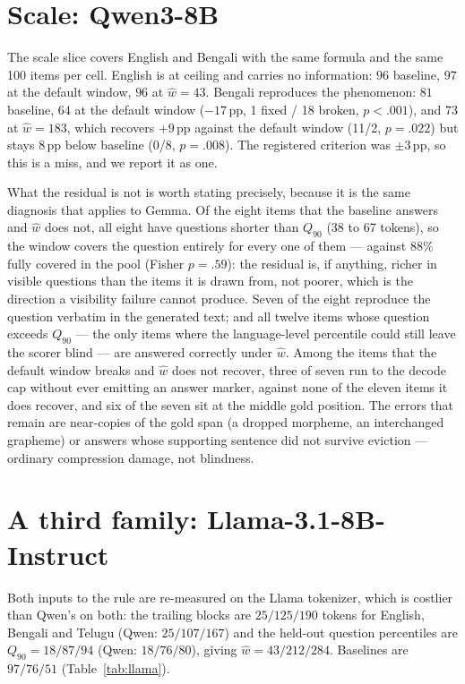 \documentclass{article}
\begin{document}
\section{Scale: Qwen3-8B}
\label{app:8b}

The scale slice covers English and Bengali with the same formula and the
same 100 items per cell. English is at ceiling and carries no
information: $96$ baseline, $97$ at the default window, $96$ at
$\hat w{=}43$. Bengali reproduces the phenomenon: $81$ baseline, $64$ at
the default window ($-17$\,pp, 1 fixed / 18 broken, $p{<}.001$), and $73$
at $\hat w{=}183$, which recovers $+9$\,pp against the default window
(11/2, $p{=}.022$) but stays $8$\,pp below baseline (0/8, $p{=}.008$).
The registered criterion was $\pm 3$\,pp, so this is a miss, and we
report it as one.

What the residual is not is worth stating precisely, because it is the
same diagnosis that applies to Gemma. Of the eight items that the
baseline answers and $\hat w$ does not, all eight have questions shorter
than $Q_{90}$ (38 to 67 tokens), so the window covers the question
entirely for every one of them --- against $88\%$ fully covered in the
pool (Fisher $p{=}.59$): the residual is, if anything, richer in
visible questions than the items it is drawn from, not poorer, which
is the direction a visibility failure cannot produce.
Seven of the eight reproduce the question
verbatim in the generated text; and all twelve items whose question
exceeds $Q_{90}$ --- the only items where the language-level percentile
could still leave the scorer blind --- are answered correctly under
$\hat w$. Among the items that the default window breaks and $\hat w$
does not recover, three of seven run to the decode cap without ever
emitting an answer marker, against none of the eleven items it does
recover, and six of the seven sit at the middle gold position. The
errors that remain are near-copies of the gold span (a dropped morpheme,
an interchanged grapheme) or answers whose supporting sentence did not
survive eviction --- ordinary compression damage, not blindness.

\section{A third family: Llama-3.1-8B-Instruct}
\label{app:llama}

Both inputs to the rule are re-measured on the Llama tokenizer, which
is costlier than Qwen's on both: the trailing blocks are $25/125/190$
tokens for English, Bengali and Telugu (Qwen: $25/107/167$) and the
held-out question percentiles are $Q_{90}{=}18/87/94$ (Qwen:
$18/76/80$), giving $\hat w = 43/212/284$. Baselines are $97/76/51$
(Table~\ref{tab:llama}).
\end{document}
